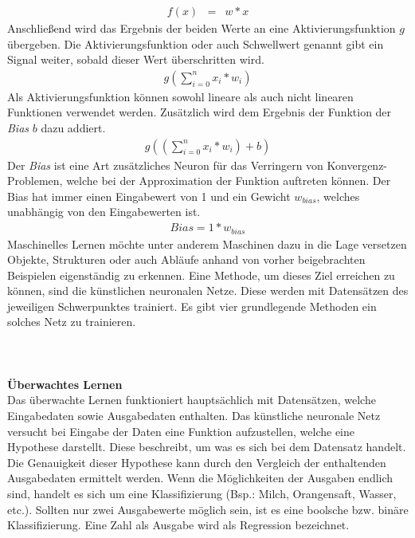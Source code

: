 \begin{eqnarray} f(x) & = & w*x \end{eqnarray}
Anschließend wird das Ergebnis der beiden Werte an eine Aktivierungsfunktion $g$ übergeben. Die Aktivierungsfunktion oder auch Schwellwert genannt gibt ein Signal weiter, sobald dieser Wert überschritten wird.
\begin{eqnarray} g( \sum_{i=0}^n x_{i} *w_{i}) \end{eqnarray}
Als Aktivierungsfunktion können sowohl lineare als auch nicht linearen Funktionen verwendet werden. Zusätzlich wird dem Ergebnis der Funktion der \textit{Bias} $b$ dazu addiert.
\begin{eqnarray} g(( \sum_{i=0}^n x_{i} *w_{i}) +b) \end{eqnarray}
Der \textit{Bias} ist eine Art zusätzliches Neuron für das Verringern von Konvergenz-Problemen, welche bei der Approximation der Funktion auftreten können. Der Bias hat immer einen Eingabewert von 1 und ein Gewicht $w_{bias}$, welches unabhängig von den Eingabewerten ist.
\begin{eqnarray} Bias = 1*w_{bias} \end{eqnarray}
Maschinelles Lernen möchte unter anderem Maschinen dazu in die Lage versetzen Objekte, Strukturen oder auch Abläufe anhand von vorher beigebrachten Beispielen eigenständig zu erkennen. Eine Methode, um dieses Ziel erreichen zu können, sind die künstlichen neuronalen Netze. Diese werden mit Datensätzen des jeweiligen Schwerpunktes trainiert. Es gibt vier grundlegende Methoden ein solches Netz zu trainieren.\\\\\\\\
\textbf{Überwachtes Lernen}\\
Das überwachte Lernen funktioniert hauptsächlich mit Datensätzen, welche Eingabedaten sowie Ausgabedaten enthalten. Das künstliche neuronale Netz versucht bei Eingabe der Daten eine Funktion aufzustellen, welche eine Hypothese darstellt. Diese beschreibt, um was es sich bei dem Datensatz handelt. Die Genauigkeit dieser Hypothese kann durch den Vergleich der enthaltenden Ausgabedaten ermittelt werden. Wenn die Möglichkeiten der Ausgaben endlich sind, handelt es sich um eine Klassifizierung (Bsp.: Milch, Orangensaft, Wasser, etc.). Sollten nur zwei Ausgabewerte möglich sein, ist es eine boolsche bzw. binäre Klassifizierung. Eine Zahl als Ausgabe wird als Regression bezeichnet.\\\\
